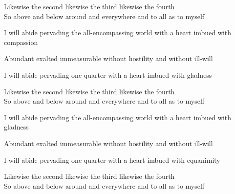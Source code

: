 \begin{english}
Likewise the second likewise the third likewise the fourth\\
So above and below around and everywhere and to all as to myself\\
\end{english}

\begin{english-hang}
I will abide pervading the all-encompassing world with a heart imbued with compassion\\
\end{english-hang}

\begin{english-hang}
Abundant exalted immeasurable without hostility and without ill-will
\end{english-hang}

\medskip

\begin{english-hang}
I will abide pervading one quarter with a heart imbued with gladness\hyperlink{endnote96-appendix}{\hypertarget{endnote96-body}{}}\\
\end{english-hang}

\begin{english}
Likewise the second likewise the third likewise the fourth\\
So above and below around and everywhere and to all as to myself\\
\end{english}

\begin{english-hang}
I will abide pervading the all-encompassing world with a heart imbued with gladness\\
\end{english-hang}

\begin{english-hang}
Abundant exalted immeasurable without hostility and without ill-will
\end{english-hang}

\medskip

\begin{english-hang}
I will abide pervading one quarter with a heart imbued with equanimity\\
\end{english-hang}

\begin{english}
Likewise the second likewise the third likewise the fourth\\
So above and below around and everywhere and to all as to myself\\
\end{english}

